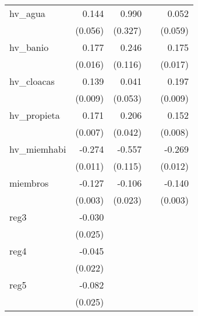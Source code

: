 {\begin{longtable}{l*{4}{D{.}{.}{-1}}}
\addlinespace
hv\_agua     &       0.144\sym{*}  &       0.990\sym{**} &                     &       0.052         \\
            &     (0.056)         &     (0.327)         &                     &     (0.059)         \\
\addlinespace
hv\_banio    &       0.177\sym{***}&       0.246\sym{*}  &                     &       0.175\sym{***}\\
            &     (0.016)         &     (0.116)         &                     &     (0.017)         \\
\addlinespace
hv\_cloacas  &       0.139\sym{***}&       0.041         &                     &       0.197\sym{***}\\
            &     (0.009)         &     (0.053)         &                     &     (0.009)         \\
\addlinespace
hv\_propieta &       0.171\sym{***}&       0.206\sym{***}&                     &       0.152\sym{***}\\
            &     (0.007)         &     (0.042)         &                     &     (0.008)         \\
\addlinespace
hv\_miemhabi &      -0.274\sym{***}&      -0.557\sym{***}&                     &      -0.269\sym{***}\\
            &     (0.011)         &     (0.115)         &                     &     (0.012)         \\
\addlinespace
miembros    &      -0.127\sym{***}&      -0.106\sym{***}&                     &      -0.140\sym{***}\\
            &     (0.003)         &     (0.023)         &                     &     (0.003)         \\
\addlinespace
reg3        &      -0.030         &                     &                     &                     \\
            &     (0.025)         &                     &                     &                     \\
\addlinespace
reg4        &      -0.045\sym{*}  &                     &                     &                     \\
            &     (0.022)         &                     &                     &                     \\
\addlinespace
reg5        &      -0.082\sym{***}&                     &                     &                     \\
            &     (0.025)         &                     &                     &                     \\

\end{longtable}}
